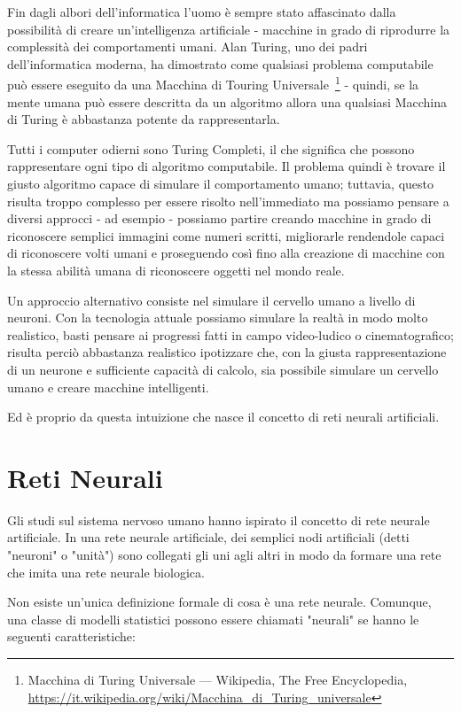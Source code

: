 \nocite{Lipton:2009}
Fin dagli albori dell'informatica l'uomo \`e sempre stato affascinato dalla
possibilit\`a di creare un'intelligenza artificiale - macchine in grado di
riprodurre la complessit\`a dei comportamenti umani. Alan Turing, uno dei padri
dell'informatica moderna, ha dimostrato come qualsiasi problema computabile pu\`o
essere eseguito da una Macchina di Touring Universale~\footnote{Macchina di Turing
Universale --- Wikipedia, The Free Encyclopedia,
\url{https://it.wikipedia.org/wiki/Macchina_di_Turing_universale} } - quindi, se
la mente umana pu\`o essere descritta da un algoritmo allora una qualsiasi Macchina
di Turing \`e abbastanza potente da rappresentarla.

Tutti i computer odierni sono Turing Completi, il che significa che possono
rappresentare ogni tipo di algoritmo computabile. Il problema quindi \`e trovare
il giusto algoritmo capace di simulare il comportamento umano; tuttavia, questo
risulta troppo complesso per essere risolto nell'immediato ma possiamo pensare a
diversi approcci - ad esempio - possiamo partire creando macchine in grado di
riconoscere semplici immagini come numeri scritti, migliorarle rendendole capaci
di riconoscere volti umani e proseguendo cos\`i fino alla creazione di macchine
con la stessa abilit\`a umana di riconoscere oggetti nel mondo reale.

Un approccio alternativo consiste nel simulare il cervello umano a livello di neuroni.
Con la tecnologia attuale possiamo simulare la realt\`a in modo molto realistico,
basti pensare ai progressi fatti in campo video-ludico o cinematografico; risulta
perci\`o abbastanza realistico ipotizzare che, con la giusta rappresentazione di
un neurone e sufficiente capacit\`a di calcolo, sia possibile simulare un cervello
umano e creare macchine intelligenti.

Ed \`e proprio da questa intuizione che nasce il concetto di reti neurali artificiali.

\section{Reti Neurali}

Gli studi sul sistema nervoso umano hanno ispirato il concetto di rete neurale
artificiale. In una rete neurale artificiale, dei semplici nodi artificiali
(detti "neuroni" o "unit\`a") sono collegati gli uni agli altri in modo da formare
una rete che imita una rete neurale biologica.

Non esiste un'unica definizione formale di cosa \`e una rete neurale.
Comunque, una classe di modelli statistici possono essere chiamati "neurali" se
hanno le seguenti caratteristiche:

